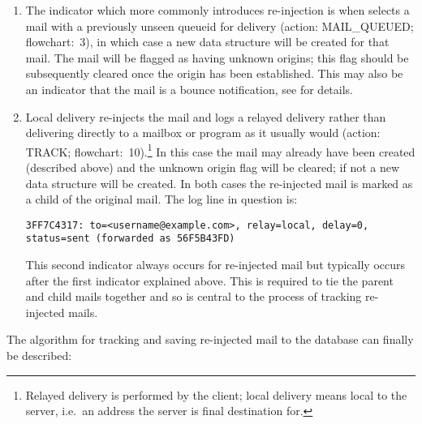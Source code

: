 \begin{enumerate}

    \item The indicator which more commonly introduces re-injection is when
         selects a mail with a previously unseen queueid for
        delivery (action: MAIL\_QUEUED\@; flowchart:~3), in which case a
        new data structure will be created for that mail.  The mail will be
        flagged as having unknown origins; this flag should be subsequently
        cleared once the origin has been established.  This may also be an
        indicator that the mail is a bounce notification, see
         for details.

    \item Local delivery re-injects the mail and logs a relayed delivery
        rather than delivering directly to a mailbox or program as it
        usually would (action: TRACK\@; flowchart:~10).\footnote{Relayed
        delivery is performed by the \SMTP{} client; local delivery means
        local to the server, i.e.\ an address the server is final
        destination for.} In this case the mail may already have been
        created (described above) and the unknown origin flag will be
        cleared; if not a new data structure will be created.  In both
        cases the re-injected mail is marked as a child of the original
        mail.  The log line in question is:

        \texttt{3FF7C4317: to=<username@example.com>, relay=local, \newline{}
        delay=0, status=sent (forwarded as 56F5B43FD)}

        This second indicator always occurs for re-injected mail but
        typically occurs after the first indicator explained above.  This
        is required to tie the parent and child mails together and so is
        central to the process of tracking re-injected mails.

\end{enumerate}

The algorithm for tracking and saving re-injected mail to the database can
finally be described:

